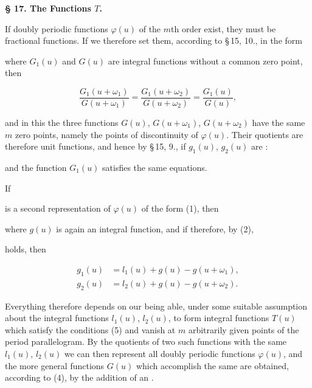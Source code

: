 
\begin{center}
\textbf{§ 17. The Functions $T$.}
\end{center}

If doubly periodic functions $\varphi(u)$ of the $m$th order exist, they must be fractional functions. If we therefore set them, according to \S\,15, 10., in the form


where $G_1(u)$ and $G(u)$ are integral functions without a common zero point, then

\[
\frac{G_1(u+\omega_1)}{G(u+\omega_1)} = \frac{G_1(u+\omega_2)}{G(u+\omega_2)} = \frac{G_1(u)}{G(u)},
\]

and in this the three functions $G(u)$, $G(u+\omega_1)$, $G(u+\omega_2)$ have the same $m$ zero points, namely the points of discontinuity of $\varphi(u)$. Their quotients are therefore unit functions, and hence by \S\,15, 9., if $g_1(u)$, $g_2(u)$ are :


and the function $G_1(u)$ satisfies the same equations.

If


is a second representation of $\varphi(u)$ of the form (1), then


where $g(u)$ is again an integral function, and if therefore, by (2),


holds, then

\[
\begin{aligned}
g_1(u) &= l_1(u) + g(u) - g(u+\omega_1),\\
g_2(u) &= l_2(u) + g(u) - g(u+\omega_2).
\end{aligned}
\]

Everything therefore depends on our being able, under some suitable assumption about the integral functions $l_1(u)$, $l_2(u)$, to form integral functions $T(u)$ which satisfy the conditions (5) and vanish at $m$ arbitrarily given points of the period parallelogram. By the quotients of two such functions with the same $l_1(u)$, $l_2(u)$ we can then represent all doubly periodic functions $\varphi(u)$, and the more general functions $G(u)$ which accomplish the same are obtained, according to (4), by the addition of an .
